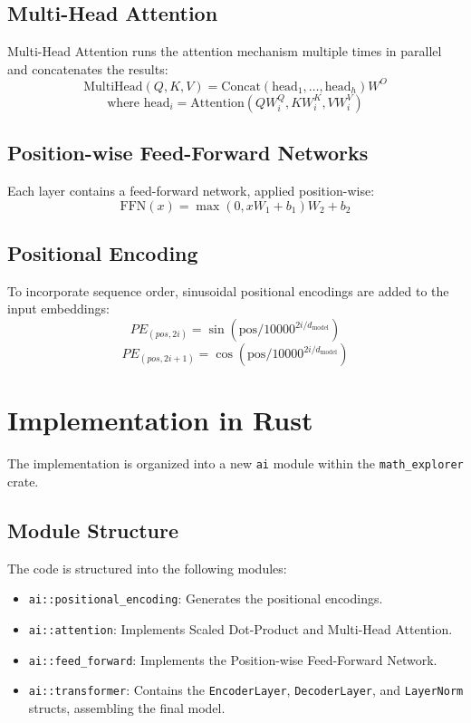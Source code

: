 \documentclass{article}
\begin{document}
\subsection{Multi-Head Attention}
Multi-Head Attention runs the attention mechanism multiple times in parallel and concatenates the results:
\[ \text{MultiHead}(Q, K, V) = \text{Concat}(\text{head}_1, \dots, \text{head}_h)W^O \]
\[ \text{where head}_i = \text{Attention}(QW_i^Q, KW_i^K, VW_i^V) \]

\subsection{Position-wise Feed-Forward Networks}
Each layer contains a feed-forward network, applied position-wise:
\[ \text{FFN}(x) = \max(0, xW_1 + b_1)W_2 + b_2 \]

\subsection{Positional Encoding}
To incorporate sequence order, sinusoidal positional encodings are added to the input embeddings:
\[ PE_{(pos, 2i)} = \sin(\text{pos} / 10000^{2i/d_{\text{model}}}) \]
\[ PE_{(pos, 2i+1)} = \cos(\text{pos} / 10000^{2i/d_{\text{model}}}) \]

\section{Implementation in Rust}
The implementation is organized into a new \texttt{ai} module within the \texttt{math\_explorer} crate.

\subsection{Module Structure}
The code is structured into the following modules:
\begin{itemize}
    \item \texttt{ai::positional\_encoding}: Generates the positional encodings.
    \item \texttt{ai::attention}: Implements Scaled Dot-Product and Multi-Head Attention.
    \item \texttt{ai::feed\_forward}: Implements the Position-wise Feed-Forward Network.
    \item \texttt{ai::transformer}: Contains the \texttt{EncoderLayer}, \texttt{DecoderLayer}, and \texttt{LayerNorm} structs, assembling the final model.
\end{itemize}
\end{document}

